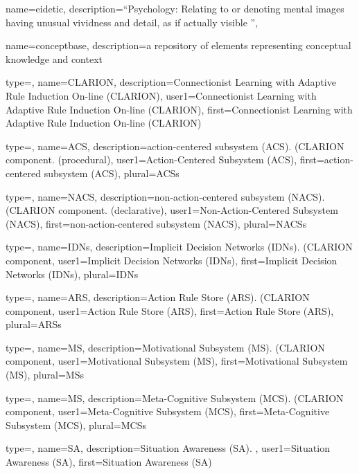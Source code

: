 {
  name=eidetic,
  description={``Psychology: Relating to or denoting mental images having unusual vividness and detail, as if actually visible \citep{Oxford2014}''},
}

{
  name=concept\textendash{}base,
  description={a repository of   elements representing \gls{conceptual knowledge} and \gls{context}}
}

{
  type=\acronymtype,
  name=CLARION,
  description={Connectionist Learning with Adaptive Rule Induction On-line (CLARION)},
  user1={Connectionist Learning with Adaptive Rule Induction On-line (CLARION)},
  first={Connectionist Learning with Adaptive Rule Induction On-line (CLARION)}
}

{
  type=\acronymtype,
  name=ACS,
  description={action-centered subsystem (ACS). (\gls{CLARION} component. (procedural)},
  user1={Action-Centered Subsystem (ACS)},
  first={action-centered subsystem (ACS)},
  plural={ACSs}
}

{
  type=\acronymtype,
  name=NACS,
  description={non-action-centered subsystem (NACS). (\gls{CLARION} component. (declarative)},
  user1={Non-Action-Centered Subsystem (NACS)},
  first={non-action-centered subsystem (NACS)},
  plural={NACSs}
}


{
  type=\acronymtype,
  name=IDNs,
  description={Implicit Decision Networks (IDNs). (\gls{CLARION} component},
  user1={Implicit Decision Networks (IDNs)},
  first={Implicit Decision Networks (IDNs)},
  plural={IDNs}
}

{
  type=\acronymtype,
  name=ARS,
  description={Action Rule Store (ARS). (\gls{CLARION} component},
  user1={Action Rule Store (ARS)},
  first={Action Rule Store (ARS)},
  plural={ARSs}
}

{
  type=\acronymtype,
  name=MS,
  description={Motivational Subsystem (MS). (\gls{CLARION} component},
  user1={Motivational Subsystem (MS)},
  first={Motivational Subsystem (MS)},
  plural={MSs}
}

{
  type=\acronymtype,
  name=MS,
  description={Meta-Cognitive Subsystem (MCS). (\gls{CLARION} component},
  user1={Meta-Cognitive Subsystem (MCS)},
  first={Meta-Cognitive Subsystem (MCS)},
  plural={MCSs}
}

{
  type=\acronymtype,
  name=SA,
  description={Situation Awareness (SA). },
  user1={Situation Awareness (SA)},
  first={Situation Awareness (SA)}
}

